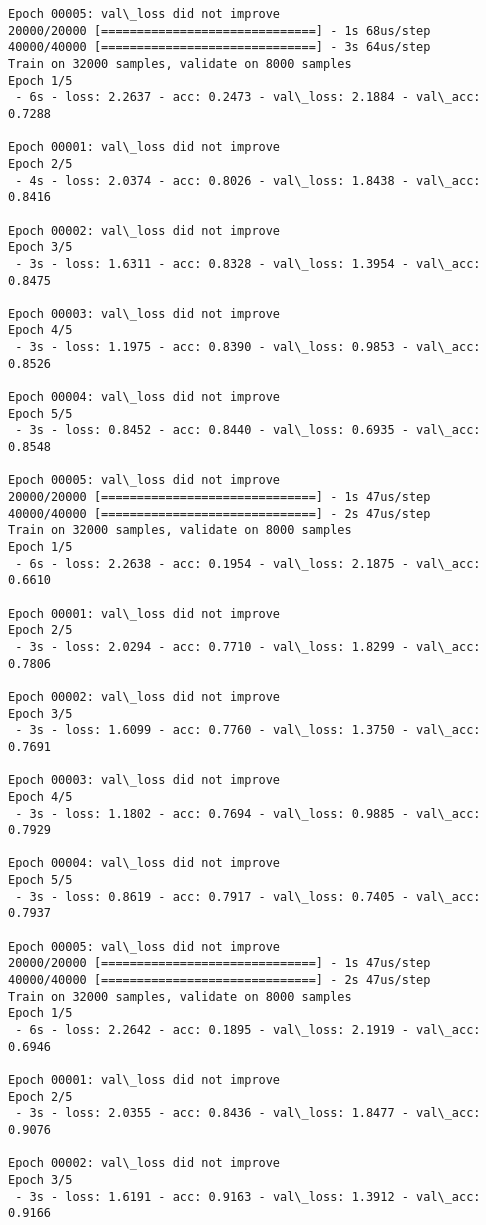 \documentclass[11pt]{article}
\begin{document}
\begin{Verbatim}[commandchars=\\\{\}]
Epoch 00005: val\_loss did not improve
20000/20000 [==============================] - 1s 68us/step
40000/40000 [==============================] - 3s 64us/step
Train on 32000 samples, validate on 8000 samples
Epoch 1/5
 - 6s - loss: 2.2637 - acc: 0.2473 - val\_loss: 2.1884 - val\_acc: 0.7288

Epoch 00001: val\_loss did not improve
Epoch 2/5
 - 4s - loss: 2.0374 - acc: 0.8026 - val\_loss: 1.8438 - val\_acc: 0.8416

Epoch 00002: val\_loss did not improve
Epoch 3/5
 - 3s - loss: 1.6311 - acc: 0.8328 - val\_loss: 1.3954 - val\_acc: 0.8475

Epoch 00003: val\_loss did not improve
Epoch 4/5
 - 3s - loss: 1.1975 - acc: 0.8390 - val\_loss: 0.9853 - val\_acc: 0.8526

Epoch 00004: val\_loss did not improve
Epoch 5/5
 - 3s - loss: 0.8452 - acc: 0.8440 - val\_loss: 0.6935 - val\_acc: 0.8548

Epoch 00005: val\_loss did not improve
20000/20000 [==============================] - 1s 47us/step
40000/40000 [==============================] - 2s 47us/step
Train on 32000 samples, validate on 8000 samples
Epoch 1/5
 - 6s - loss: 2.2638 - acc: 0.1954 - val\_loss: 2.1875 - val\_acc: 0.6610

Epoch 00001: val\_loss did not improve
Epoch 2/5
 - 3s - loss: 2.0294 - acc: 0.7710 - val\_loss: 1.8299 - val\_acc: 0.7806

Epoch 00002: val\_loss did not improve
Epoch 3/5
 - 3s - loss: 1.6099 - acc: 0.7760 - val\_loss: 1.3750 - val\_acc: 0.7691

Epoch 00003: val\_loss did not improve
Epoch 4/5
 - 3s - loss: 1.1802 - acc: 0.7694 - val\_loss: 0.9885 - val\_acc: 0.7929

Epoch 00004: val\_loss did not improve
Epoch 5/5
 - 3s - loss: 0.8619 - acc: 0.7917 - val\_loss: 0.7405 - val\_acc: 0.7937

Epoch 00005: val\_loss did not improve
20000/20000 [==============================] - 1s 47us/step
40000/40000 [==============================] - 2s 47us/step
Train on 32000 samples, validate on 8000 samples
Epoch 1/5
 - 6s - loss: 2.2642 - acc: 0.1895 - val\_loss: 2.1919 - val\_acc: 0.6946

Epoch 00001: val\_loss did not improve
Epoch 2/5
 - 3s - loss: 2.0355 - acc: 0.8436 - val\_loss: 1.8477 - val\_acc: 0.9076

Epoch 00002: val\_loss did not improve
Epoch 3/5
 - 3s - loss: 1.6191 - acc: 0.9163 - val\_loss: 1.3912 - val\_acc: 0.9166


\end{Verbatim}
\end{document}
